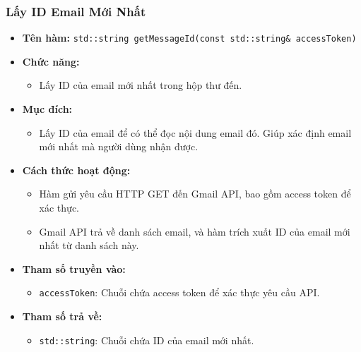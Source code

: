 \subsubsection{Lấy ID Email Mới Nhất}
\begin{itemize}
    \item \textbf{Tên hàm:} \texttt{std::string getMessageId(const std::string\& accessToken)}
    \item \textbf{Chức năng:} 
    \begin{itemize}
        \item Lấy ID của email mới nhất trong hộp thư đến.
    \end{itemize}
    \item \textbf{Mục đích:} 
    \begin{itemize}
        \item Lấy ID của email để có thể đọc nội dung email đó. Giúp xác định email mới nhất mà người dùng nhận được.
    \end{itemize}
    \item \textbf{Cách thức hoạt động:} 
    \begin{itemize}
        \item Hàm gửi yêu cầu HTTP GET đến Gmail API, bao gồm access token để xác thực.
        \item Gmail API trả về danh sách email, và hàm trích xuất ID của email mới nhất từ danh sách này.
    \end{itemize}
    \item \textbf{Tham số truyền vào:} 
    \begin{itemize}
        \item \texttt{accessToken}: Chuỗi chứa access token để xác thực yêu cầu API.
    \end{itemize}
    \item \textbf{Tham số trả về:} 
    \begin{itemize}
        \item \texttt{std::string}: Chuỗi chứa ID của email mới nhất.
    \end{itemize}
\end{itemize}

